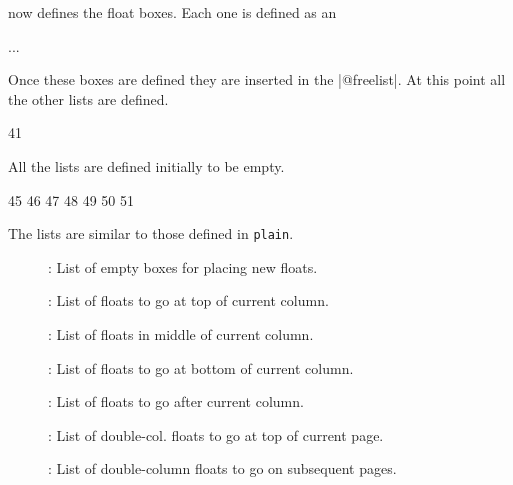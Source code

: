 \latex now defines the float boxes. Each one is defined as an 

\begin{teXXX}
\newinsert\bx@A
...
\newinsert\bx@I
\newinsert\bx@J
\newinsert\bx@K
\newinsert\bx@L
\newinsert\bx@M
\newinsert\bx@N
\newinsert\bx@O
\newinsert\bx@P
\newinsert\bx@Q
\newinsert\bx@R
\end{teXXX}



Once these boxes are defined they are inserted in the |@freelist|. At this point all the other lists are defined.

\begin{teXXX}
41 \gdef\@freelist{\@elt\bx@A\@elt\bx@B\@elt\bx@C\@elt\bx@D
         \@elt\bx@E
42                 \@elt\bx@F\@elt\bx@G\@elt\bx@H\@elt\bx@I\@elt\bx@J
43                 \@elt\bx@K\@elt\bx@L\@elt\bx@M\@elt\bx@N
44                 \@elt\bx@O\@elt\bx@P\@elt\bx@Q\@elt\bx@R}
\end{teXXX}

All the lists are defined initially to be empty.
\begin{teXXX}
45 \gdef\@toplist{}
46 \gdef\@botlist{}
47 \gdef\@midlist{}
48 \gdef\@currlist{}
49 \gdef\@deferlist{}
50 \gdef\@dbltoplist{}
51 \gdef\@dbldeferlist{}
\end{teXXX}


The lists are similar to those defined in \texttt{plain}.

\begin{description}
\item[] : List of empty boxes for placing new 
floats.
\item[\string\@toplist] : List of 
floats to go at top of current column.
\item[\string\@midlist] : List of 
floats in middle of current column.
\item[\string\@botlist] : List of 
floats to go at bottom of current column.
\item[\string\@deferlist] : List of 
floats to go after current column.
\item[\string\@dbltoplist] : List of double-col. 
floats to go at top of current
page.
\item[\string\@dbldeferlist] : List of double-column 
floats to go on subsequent
pages.

\end{description}

